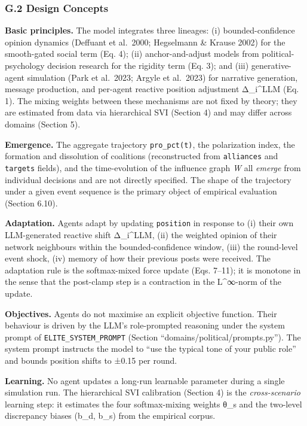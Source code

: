 \documentclass[
]{article}
\begin{document}
\subsubsection{G.2 Design Concepts}\label{g.2-design-concepts}

\textbf{Basic principles.} The model integrates three lineages: (i)
bounded-confidence opinion dynamics (Deffuant et al.~2000; Hegselmann \&
Krause 2002) for the smooth-gated social term (Eq. 4); (ii)
anchor-and-adjust models from political-psychology decision research for
the rigidity term (Eq. 3); and (iii) generative-agent simulation (Park
et al.~2023; Argyle et al.~2023) for narrative generation, message
production, and per-agent reactive position adjustment Δ\_i\^{}LLM (Eq.
1). The mixing weights between these mechanisms are not fixed by theory;
they are estimated from data via hierarchical SVI (Section 4) and may
differ across domains (Section 5).

\textbf{Emergence.} The aggregate trajectory \texttt{pro\_pct(t)}, the
polarization index, the formation and dissolution of coalitions
(reconstructed from \texttt{alliances} and \texttt{targets} fields), and
the time-evolution of the influence graph \emph{W} all \emph{emerge}
from individual decisions and are not directly specified. The shape of
the trajectory under a given event sequence is the primary object of
empirical evaluation (Section 6.10).

\textbf{Adaptation.} Agents adapt by updating \texttt{position} in
response to (i) their own LLM-generated reactive shift Δ\_i\^{}LLM, (ii)
the weighted opinion of their network neighbours within the
bounded-confidence window, (iii) the round-level event shock, (iv)
memory of how their previous posts were received. The adaptation rule is
the softmax-mixed force update (Eqs. 7--11); it is monotone in the sense
that the post-clamp step is a contraction in the L\^{}∞-norm of the
update.

\textbf{Objectives.} Agents do not maximise an explicit objective
function. Their behaviour is driven by the LLM's role-prompted reasoning
under the system prompt of \texttt{ELITE\_SYSTEM\_PROMPT} (Section
``domains/political/prompts.py''). The system prompt instructs the model
to ``use the typical tone of your public role'' and bounds position
shifts to ±0.15 per round.

\textbf{Learning.} No agent updates a long-run learnable parameter
during a single simulation run. The hierarchical SVI calibration
(Section 4) is the \emph{cross-scenario} learning step: it estimates the
four softmax-mixing weights θ\_s and the two-level discrepancy biases
(b\_d, b\_s) from the empirical corpus.
\end{document}
